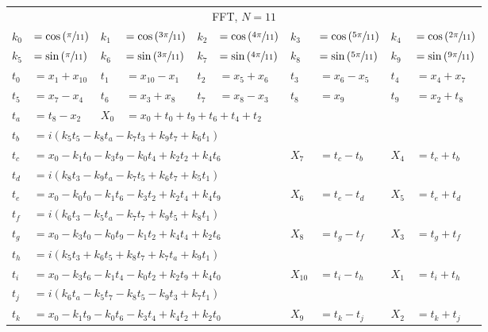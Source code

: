 \begin{tabular}{|p{4.3pt}l|p{4.3pt}l|p{4.3pt}l|p{4.3pt}l|p{4.3pt}l|}\toprule \multicolumn{10}{|c|}{FFT, $N=11$} \\
$k_0 $ &$= \cos\left(\sfrac{\pi}{11}\right)$ & $k_1 $ &$= \cos\left(\sfrac{3\pi}{11}\right)$ & $k_2 $ &$= \cos\left(\sfrac{4\pi}{11}\right)$ & $k_3 $ &$= \cos\left(\sfrac{5\pi}{11}\right)$ & $k_4 $ &$= \cos\left(\sfrac{2\pi}{11}\right)$\\ 
$k_5 $ &$= \sin\left(\sfrac{\pi}{11}\right)$ & $k_6 $ &$= \sin\left(\sfrac{3\pi}{11}\right)$ & $k_7 $ &$= \sin\left(\sfrac{4\pi}{11}\right)$ & $k_8 $ &$= \sin\left(\sfrac{5\pi}{11}\right)$ & $k_9 $ &$= \sin\left(\sfrac{9\pi}{11}\right)$\\ 
$t_0 $ &$= x_1 + x_{10}$ & $t_1 $ &$= x_{10} - x_1$ & $t_2 $ &$= x_5 + x_6$ & $t_3 $ &$= x_6 - x_5$ & $t_4 $ &$= x_4 + x_7$\\ 
$t_5 $ &$= x_7 - x_4$ & $t_6 $ &$= x_3 + x_8$ & $t_7 $ &$= x_8 - x_3$ & $t_8 $ &$= x_9$ & $t_9 $ &$= x_2 + t_8$\\ 
$t_a $ &$= t_8 - x_2$ & $X_0 $ &\multicolumn{7}{l|}{$= x_0 + t_0 + t_9 + t_6 + t_4 + t_2$}\\ 
$t_b $ &\multicolumn{9}{l|}{$= i(k_5t_5 - k_8t_a - k_7t_3 + k_9t_7 + k_6t_1)$}\\ 
$t_c $ &\multicolumn{5}{l|}{$= x_0 - k_1t_0 - k_3t_9 - k_0t_4 + k_2t_2 + k_4t_6$} & $X_7 $ &$= t_c - t_b$ & $X_4 $ &$= t_c + t_b$\\ 
$t_d $ &\multicolumn{9}{l|}{$= i(k_8t_3 - k_9t_a - k_7t_5 + k_6t_7 + k_5t_1)$}\\ 
$t_e $ &\multicolumn{5}{l|}{$= x_0 - k_0t_0 - k_1t_6 - k_3t_2 + k_2t_4 + k_4t_9$} & $X_6 $ &$= t_e - t_d$ & $X_5 $ &$= t_e + t_d$\\ 
$t_f $ &\multicolumn{9}{l|}{$= i(k_6t_3 - k_5t_a - k_7t_7 + k_9t_5 + k_8t_1)$}\\ 
$t_g $ &\multicolumn{5}{l|}{$= x_0 - k_3t_0 - k_0t_9 - k_1t_2 + k_4t_4 + k_2t_6$} & $X_8 $ &$= t_g - t_f$ & $X_3 $ &$= t_g + t_f$\\ 
$t_h $ &\multicolumn{9}{l|}{$= i(k_5t_3 + k_6t_5 + k_8t_7 + k_7t_a + k_9t_1)$}\\ 
$t_i $ &\multicolumn{5}{l|}{$= x_0 - k_3t_6 - k_1t_4 - k_0t_2 + k_2t_9 + k_4t_0$} & $X_{10} $ &$= t_i - t_h$ & $X_1 $ &$= t_i + t_h$\\ 
$t_j $ &\multicolumn{9}{l|}{$= i(k_6t_a - k_5t_7 - k_8t_5 - k_9t_3 + k_7t_1)$}\\ 
$t_k $ &\multicolumn{5}{l|}{$= x_0 - k_1t_9 - k_0t_6 - k_3t_4 + k_4t_2 + k_2t_0$} & $X_9 $ &$= t_k - t_j$ & $X_2 $ &$= t_k + t_j$\\ 
\bottomrule\end{tabular}
